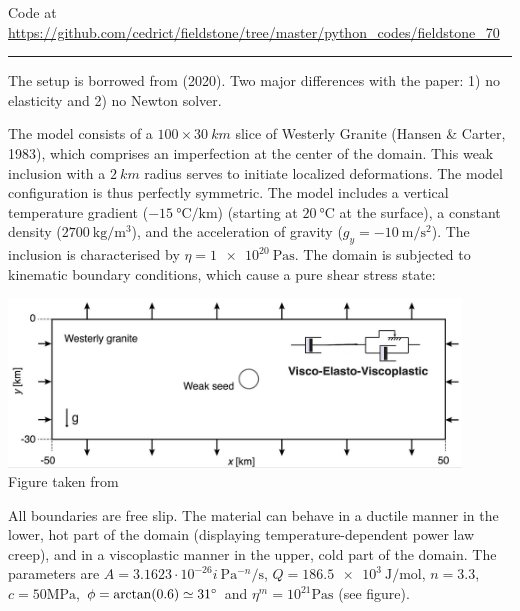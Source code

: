 

\begin{center}
Code at \url{https://github.com/cedrict/fieldstone/tree/master/python_codes/fieldstone_70}
\end{center}

\par\noindent\rule{\textwidth}{0.4pt}


The setup is borrowed from \textcite{dudy20} (2020). 
Two major differences with the paper: 1) no elasticity and 2) no Newton solver.

The model consists of a $100\times 30~\si{km}$ slice of Westerly Granite (Hansen \& Carter, 1983), 
which comprises an imperfection at the center of the domain.
This weak inclusion with a $\SI{2}{km}$ radius serves to initiate
localized deformations. The model configuration is thus perfectly symmetric. 
The model includes a vertical temperature gradient ($-15~\si{\celsius\per\km}$) (starting 
at $20~\si{\celsius}$ at the surface), a constant density ($\SI{2700}{\kg\per\cubic\metre}$), 
and the acceleration of gravity ($g_y=-\SI{10}{\metre\per\second\squared}$).
The inclusion is characterised by $\eta=\SI{1e20}{\pascal\second}$.
The domain is subjected to kinematic boundary conditions, which cause a pure shear stress state:

\begin{center}
\includegraphics[width=12cm]{python_codes/fieldstone_70/images/fig1}\\
{\captionfont Figure taken from \cite{dudy20}}
\end{center}

All boundaries are free slip. The material can behave in a ductile manner in the lower, hot
part of the domain (displaying temperature-dependent power law creep), and in a viscoplastic 
manner in the upper, cold part of the domain. The parameters are 
$A=3.1623\cdot 10^{-26}i~\si{\pascal^{-n}\per\second}$, 
$Q=\SI{186.5e3}{\joule\per\mole}$, 
$n=3.3$, $c=50\si{\mega\pascal}$, $\phi=\arctan(0.6)\simeq 31\degree$ and 
$\eta^{m}=10^{21}\si{\pascal\second}$ (see figure).

